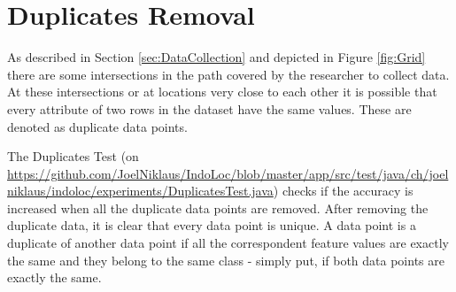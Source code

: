 


\section{Duplicates Removal}
\label{sec:DuplicatesRemoval}

As described in Section \ref{sec:DataCollection} and depicted in Figure \ref{fig:Grid} there are some intersections in the path covered by the researcher to collect data. At these intersections or at locations very close to each other it is possible that every attribute of two rows in the dataset have the same values. These are denoted as duplicate data points.

The Duplicates Test (on \url{https://github.com/JoelNiklaus/IndoLoc/blob/master/app/src/test/java/ch/joelniklaus/indoloc/experiments/DuplicatesTest.java}) checks if the accuracy is increased when all the duplicate data points are removed. After removing the duplicate data, it is clear that every data point is unique. A data point is a duplicate of another data point if all the correspondent feature values are exactly the same and they belong to the same class - simply put, if both data points are exactly the same.

